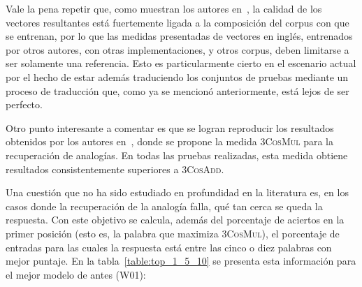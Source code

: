 Vale la pena repetir que, como muestran los autores en~\cite{Levy2015}, la calidad de los vectores
resultantes está fuertemente ligada a la composición del corpus con que se entrenan, por lo que las
medidas presentadas de vectores en inglés, entrenados por otros autores, con otras implementaciones,
y otros corpus, deben limitarse a ser solamente una referencia. Esto es particularmente cierto en el
escenario actual por el hecho de estar además traduciendo los conjuntos de pruebas mediante un
proceso de traducción que, como ya se mencionó anteriormente, está lejos de ser perfecto.

Otro punto interesante a comentar es que se logran reproducir los resultados obtenidos por los
autores en~\cite{Levy2014b}, donde se propone la medida \textsc{3CosMul} para la recuperación de
analogías. En todas las pruebas realizadas, esta medida obtiene resultados consistentemente
superiores a \textsc{3CosAdd}.

Una cuestión que no ha sido estudiado en profundidad en la literatura es, en los casos donde la
recuperación de la analogía falla, qué tan cerca se queda la respuesta. Con este objetivo se
calcula, además del porcentaje de aciertos en la primer posición (esto es, la palabra que maximiza
\textsc{3CosMul}), el porcentaje de entradas para las cuales la respuesta está entre las cinco o
diez palabras con mejor puntaje. En la tabla~\ref{table:top_1_5_10} se presenta esta información
para el mejor modelo de antes (W01):

